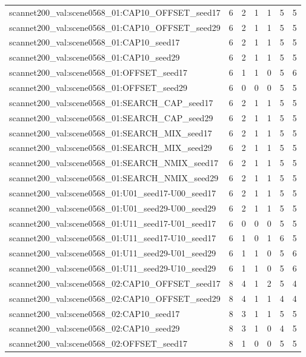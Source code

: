 \begin{table}[t]
\begin{tabular}{lrrrrrr}
scannet200\_val:scene0568\_01:CAP10\_OFFSET\_seed17 & 6 & 2 & 1 & 1 & 5 & 5 \\
scannet200\_val:scene0568\_01:CAP10\_OFFSET\_seed29 & 6 & 2 & 1 & 1 & 5 & 5 \\
scannet200\_val:scene0568\_01:CAP10\_seed17 & 6 & 2 & 1 & 1 & 5 & 5 \\
scannet200\_val:scene0568\_01:CAP10\_seed29 & 6 & 2 & 1 & 1 & 5 & 5 \\
scannet200\_val:scene0568\_01:OFFSET\_seed17 & 6 & 1 & 1 & 0 & 5 & 6 \\
scannet200\_val:scene0568\_01:OFFSET\_seed29 & 6 & 0 & 0 & 0 & 5 & 5 \\
scannet200\_val:scene0568\_01:SEARCH\_CAP\_seed17 & 6 & 2 & 1 & 1 & 5 & 5 \\
scannet200\_val:scene0568\_01:SEARCH\_CAP\_seed29 & 6 & 2 & 1 & 1 & 5 & 5 \\
scannet200\_val:scene0568\_01:SEARCH\_MIX\_seed17 & 6 & 2 & 1 & 1 & 5 & 5 \\
scannet200\_val:scene0568\_01:SEARCH\_MIX\_seed29 & 6 & 2 & 1 & 1 & 5 & 5 \\
scannet200\_val:scene0568\_01:SEARCH\_NMIX\_seed17 & 6 & 2 & 1 & 1 & 5 & 5 \\
scannet200\_val:scene0568\_01:SEARCH\_NMIX\_seed29 & 6 & 2 & 1 & 1 & 5 & 5 \\
scannet200\_val:scene0568\_01:U01\_seed17-U00\_seed17 & 6 & 2 & 1 & 1 & 5 & 5 \\
scannet200\_val:scene0568\_01:U01\_seed29-U00\_seed29 & 6 & 2 & 1 & 1 & 5 & 5 \\
scannet200\_val:scene0568\_01:U11\_seed17-U01\_seed17 & 6 & 0 & 0 & 0 & 5 & 5 \\
scannet200\_val:scene0568\_01:U11\_seed17-U10\_seed17 & 6 & 1 & 0 & 1 & 6 & 5 \\
scannet200\_val:scene0568\_01:U11\_seed29-U01\_seed29 & 6 & 1 & 1 & 0 & 5 & 6 \\
scannet200\_val:scene0568\_01:U11\_seed29-U10\_seed29 & 6 & 1 & 1 & 0 & 5 & 6 \\
scannet200\_val:scene0568\_02:CAP10\_OFFSET\_seed17 & 8 & 4 & 1 & 2 & 5 & 4 \\
scannet200\_val:scene0568\_02:CAP10\_OFFSET\_seed29 & 8 & 4 & 1 & 1 & 4 & 4 \\
scannet200\_val:scene0568\_02:CAP10\_seed17 & 8 & 3 & 1 & 1 & 5 & 5 \\
scannet200\_val:scene0568\_02:CAP10\_seed29 & 8 & 3 & 1 & 0 & 4 & 5 \\
scannet200\_val:scene0568\_02:OFFSET\_seed17 & 8 & 1 & 0 & 0 & 5 & 5 \\

\end{tabular}
\end{table}
